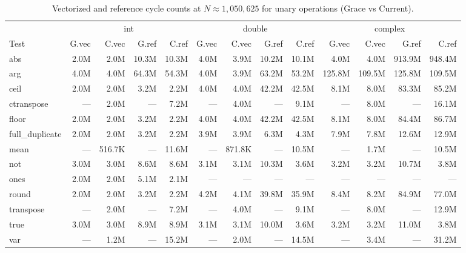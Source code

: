 \begin{table}[H]
\centering
\caption{Vectorized and reference cycle counts at $N \approx 1{,}050{,}625$ for unary operations (Grace vs Current).}
\label{tab:cycles-unary}
\tiny
\begin{tabular}{l | r r r r | r r r r | r r r r}
\toprule
 & \multicolumn{4}{c|}{int} & \multicolumn{4}{c|}{double} & \multicolumn{4}{c}{complex} \\
Test & G.vec & C.vec & G.ref & C.ref & G.vec & C.vec & G.ref & C.ref & G.vec & C.vec & G.ref & C.ref \\
\midrule
  abs & 2.0M & 2.0M & 10.3M & 10.3M & 4.0M & 3.9M & 10.2M & 10.1M & 4.0M & 4.0M & 913.9M & 948.4M \\
  arg & 4.0M & 4.0M & 64.3M & 54.3M & 4.0M & 3.9M & 63.2M & 53.2M & 125.8M & 109.5M & 125.8M & 109.5M \\
  ceil & 2.0M & 2.0M & 3.2M & 2.2M & 4.0M & 4.0M & 42.2M & 42.5M & 8.1M & 8.0M & 83.3M & 85.2M \\
  ctranspose & --- & 2.0M & --- & 7.2M & --- & 4.0M & --- & 9.1M & --- & 8.0M & --- & 16.1M \\
  floor & 2.0M & 2.0M & 3.2M & 2.2M & 4.0M & 4.0M & 42.2M & 42.5M & 8.1M & 8.0M & 84.4M & 86.7M \\
  full\_duplicate & 2.0M & 2.0M & 3.2M & 2.2M & 3.9M & 3.9M & 6.3M & 4.3M & 7.9M & 7.8M & 12.6M & 12.9M \\
  mean & --- & 516.7K & --- & 11.6M & --- & 871.8K & --- & 10.5M & --- & 1.7M & --- & 10.5M \\
  not & 3.0M & 3.0M & 8.6M & 8.6M & 3.1M & 3.1M & 10.3M & 3.6M & 3.2M & 3.2M & 10.7M & 3.8M \\
  ones & 2.0M & 2.0M & 5.1M & 2.1M & --- & --- & --- & --- & --- & --- & --- & --- \\
  round & 2.0M & 2.0M & 3.2M & 2.2M & 4.2M & 4.1M & 39.8M & 35.9M & 8.4M & 8.2M & 84.9M & 77.0M \\
  transpose & --- & 2.0M & --- & 7.2M & --- & 4.0M & --- & 9.1M & --- & 8.0M & --- & 12.9M \\
  true & 3.0M & 3.0M & 8.9M & 8.9M & 3.1M & 3.1M & 10.0M & 3.6M & 3.2M & 3.2M & 11.0M & 3.8M \\
  var & --- & 1.2M & --- & 15.2M & --- & 2.0M & --- & 14.5M & --- & 3.4M & --- & 31.2M \\
\bottomrule
\end{tabular}
\end{table}

